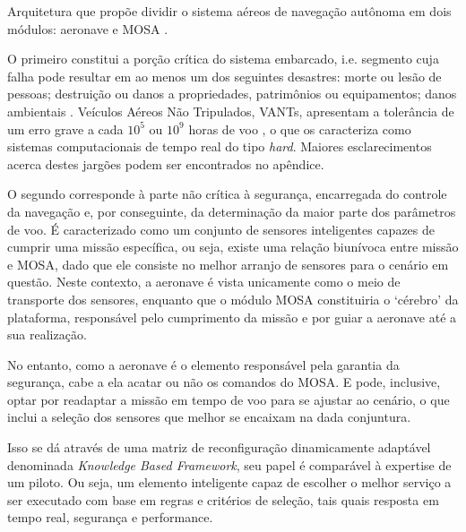 Arquitetura que propõe dividir o sistema aéreos de navegação autônoma em dois módulos: aeronave e MOSA \cite{mosa_proposal}.

O primeiro constitui a porção crítica do sistema embarcado, i.e. segmento cuja falha pode resultar em ao menos um dos seguintes desastres: morte 
ou lesão de pessoas; destruição ou danos a propriedades, patrimônios ou equipamentos; danos ambientais \cite{safety}.
Veículos Aéreos Não Tripulados, VANTs, apresentam a tolerância de um erro grave a cada $10^5$ ou $10^9$ horas de voo \cite{hard}, o que os 
caracteriza
como sistemas computacionais de tempo real do tipo \textit{hard}. 
Maiores esclarecimentos acerca destes jargões podem ser encontrados no apêndice.

O segundo corresponde à parte não crítica à segurança, encarregada do controle da navegação e, por conseguinte, da determinação da maior parte dos 
parâmetros de voo. É caracterizado como um conjunto de sensores inteligentes capazes de cumprir uma missão específica, ou seja, 
existe uma relação biunívoca entre missão e MOSA, dado que ele consiste no melhor arranjo de sensores para o cenário em questão. Neste contexto, a 
aeronave é vista unicamente como o meio de transporte dos sensores, enquanto que o módulo MOSA constituiria o \textquoteleft cérebro\textquoteright{}  
da plataforma, responsável pelo cumprimento da missão e por guiar a aeronave até a sua realização.


No entanto, como a aeronave é o elemento responsável pela garantia da segurança, cabe a ela acatar ou não os comandos do MOSA. E pode, inclusive, 
optar por readaptar a missão em tempo de voo para se ajustar ao cenário, o que inclui a seleção dos sensores que melhor se encaixam na dada 
conjuntura.

Isso se dá através de uma matriz de reconfiguração dinamicamente adaptável denominada \textit{Knowledge Based Framework}, seu papel é comparável à 
expertise de um piloto.
Ou seja, um elemento inteligente capaz de escolher o melhor serviço  a ser executado com base em regras e critérios de seleção, tais quais resposta 
em tempo 
real, segurança e performance.


